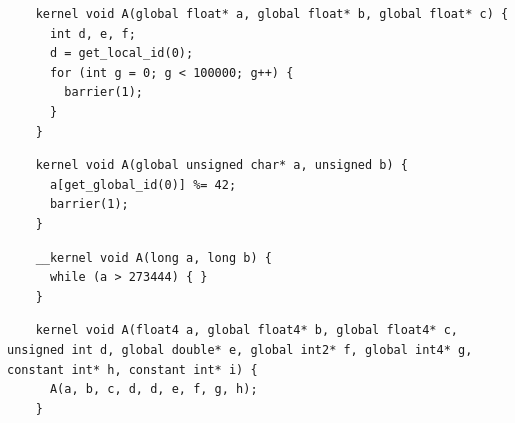 
\newsavebox{\NvidiaOptLoopHang}
\begin{lrbox}{\NvidiaOptLoopHang}
  \hspace{1.5em}
  \begin{lstlisting}
    kernel void A(global float* a, global float* b, global float* c) {
      int d, e, f;
      d = get_local_id(0);
      for (int g = 0; g < 100000; g++) {
        barrier(1);
      }
    }
  \end{lstlisting}
\end{lrbox}

\newsavebox{\XeonPhiSpin}
\begin{lrbox}{\XeonPhiSpin}
  \hspace{1.5em}
  \begin{lstlisting}
    kernel void A(global unsigned char* a, unsigned b) {
      a[get_global_id(0)] %= 42;
      barrier(1);
    }
  \end{lstlisting}
\end{lrbox}

\newsavebox{\IntelOptLoopHang}
\begin{lrbox}{\IntelOptLoopHang}
  \hspace{1.5em}
  \begin{lstlisting}
    __kernel void A(long a, long b) {
      while (a > 273444) { }
    }
  \end{lstlisting}
\end{lrbox}


\newsavebox{\NvidiaRecursionSegfault}
\begin{lrbox}{\NvidiaRecursionSegfault}
  \hspace{1.5em}
  \begin{lstlisting}
    kernel void A(float4 a, global float4* b, global float4* c, unsigned int d, global double* e, global int2* f, global int4* g, constant int* h, constant int* i) {
      A(a, b, c, d, d, e, f, g, h);
    }
  \end{lstlisting}
\end{lrbox}

